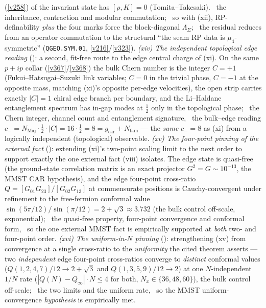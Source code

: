 \documentclass[11pt,a4paper]{article}
\newcommand{\Nfam}{N_{\mathrm{fam}}}
\newcommand{\gcar}{g_{\mathrm{car}}}
\begin{document}
\begin{keybox}
(\vref{v258}) of the invariant state has $[\rho,K]{=}0$ (Tomita--Takesaki). \mE\ the inheritance, contraction and
modular commutation; \mC\ so with (xii), RP-definability \emph{plus} the four marks force the block-diagonal
$\Lambda_\Sigma$; \mO\ the residual reduces from an operator commutation to the structural ``the seam RP data is
$\mu_4$-symmetric'' (\texttt{QGEO.SYM.01}, \vref{v216}/\vref{v323}). \emph{(xiv) The independent topological edge
reading} (): a second, fit-free route to the edge central charge of (xi). On the
same $p{+}ip$ collar (\vref{v367}/\vref{v368}) the bulk Chern number is the integer $C{=}{+}1$
(Fukui--Hatsugai--Suzuki link variables; $C{=}0$ in the trivial phase, $C{=}{-}1$ at the opposite mass, matching
(xi)'s opposite per-edge velocities), the open strip carries exactly $|C|{=}1$ chiral edge branch per boundary, and
the Li--Haldane entanglement spectrum has in-gap modes at $\tfrac12$ only in the topological phase; \mE\ the Chern
integer, channel count and entanglement signature, \mC\ the bulk--edge reading $c_-{=}N_{\mathrm{Maj}}\cdot\tfrac12
\cdot|C|{=}16\cdot\tfrac12{=}8{=}\gcar{+}\Nfam$ --- the \emph{same} $c_-{=}8$ as (xi) from a logically independent
(topological) observable. \emph{(xv) The four-point pinning of the external fact}
(): extending (xi)'s two-point scaling limit to the next order to support
exactly the one external fact (viii) isolates. The edge state is quasi-free (the ground-state correlation matrix is
an exact projector $G^2{=}G\sim10^{-13}$, the MMST CAR hypothesis), and the edge four-point cross-ratio
$Q{=}[G_{01}G_{23}]/[G_{02}G_{13}]$ at commensurate positions is Cauchy-convergent under refinement to the
free-fermion conformal value $\sin(5\pi/12)/\sin(\pi/12){=}2{+}\sqrt3\approx3.732$ (the bulk control off-scale,
exponential); \mE\ the quasi-free property, four-point convergence and conformal form, \mC\ so the one external MMST
fact is empirically supported at \emph{both} two- and four-point order. \emph{(xvi) The uniform-in-$N$ pinning}
(): strengthening (xv) from convergence at a single cross-ratio to the
\emph{uniformity} the cited theorem asserts --- two \emph{independent} edge four-point cross-ratios converge to
\emph{distinct} conformal values ($Q(1,2,4,7)/12\to2{+}\sqrt3$ and $Q(1,3,5,9)/12\to2$) at one $N$-independent
$1/N$ rate ($|Q(N){-}Q_\infty|\cdot N\le4$ for both, $N_x\in\{36,48,60\}$), the bulk control off-scale; \mE\ the
two limits and the uniform rate, \mC\ so the MMST uniform-convergence \emph{hypothesis} is empirically met.

\end{keybox}
\end{document}
